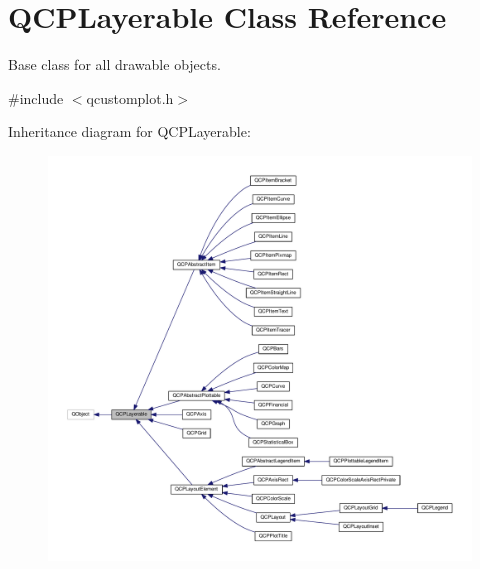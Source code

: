 \hypertarget{classQCPLayerable}{}\section{Q\+C\+P\+Layerable Class Reference}
\label{classQCPLayerable}


Base class for all drawable objects.  




{\ttfamily \#include $<$qcustomplot.\+h$>$}



Inheritance diagram for Q\+C\+P\+Layerable\+:\nopagebreak
\begin{figure}[H]
\begin{center}
\leavevmode
\includegraphics[width=350pt]{classQCPLayerable__inherit__graph}
\end{center}
\end{figure}


